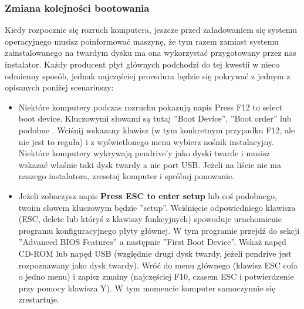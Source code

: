 \subsubsection{Zmiana kolejności bootowania}
Kiedy rozpocznie się rozruch komputera, jeszcze przed załadowaniem się systemu operacyjnego musisz poinformować maszynę, że tym razem  zamiast systemu zainstalowanego na twardym dysku ma ona wykorzystać przygotowany przez nas instalator. Każdy producent płyt głównych podchodzi do tej kwestii w nieco odmienny sposób, jednak najczęściej procedura będzie się pokrywać z jednym z opisanych poniżej scenariuszy:
\begin{itemize}
\item Niektóre komputery podczas rozruchu pokazują napis Press F12 to select boot device. Kluczowymi słowami są tutaj ”Boot Device”, ”Boot order” lub podobne . Wciśnij wskazany klawisz (w tym konkretnym przypadku F12, ale nie jest to reguła) i z wyświetlonego menu wybierz nośnik instalacyjny. Niektóre komputery wykrywają pendrive'y jako dyski twarde i musisz wskazać właśnie taki dysk twardy a nie port USB. Jeżeli na liście nie ma naszego instalatora, zresetuj komputer i spróbuj ponowanie.
\item Jeżeli zobaczysz napis \textbf{Press ESC to enter setup} lub coś podobnego, twoim słowem kluczowym będzie ”setup”. Wciśnięcie odpowiedniego klawisza (ESC, delete lub któryś z klawiszy funkcyjnych) spowoduje uruchomienie programu konfiguracyjnego płyty głównej. W tym programie przejdź do sekcji ”Advanced BIOS Features” a następnie ”First Boot Device”. Wskaż napęd CD-ROM lub napęd USB (względnie drugi dysk twardy, jeżeli pendrive jest rozpoznawany jako dysk twardy). Wróć do menu głównego (klawisz ESC cofa o jedno menu) i zapisz zmainy (najczęściej F10, czasem ESC i potwierdzenie przy pomocy klawisza Y). W tym momencie komputer samoczynnie się zrestartuje.
\end{itemize}
